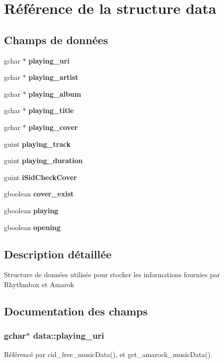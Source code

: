 \section{Référence de la structure data}
\label{structdata}
\subsection*{Champs de données}
\begin{CompactItemize}
\item 
gchar $\ast$ {\bf playing\_\-uri}
\item 
gchar $\ast$ {\bf playing\_\-artist}
\item 
gchar $\ast$ {\bf playing\_\-album}
\item 
gchar $\ast$ {\bf playing\_\-title}
\item 
gchar $\ast$ {\bf playing\_\-cover}
\item 
guint {\bf playing\_\-track}
\item 
guint {\bf playing\_\-duration}
\item 
guint {\bf iSidCheckCover}
\item 
gboolean {\bf cover\_\-exist}
\item 
gboolean {\bf playing}
\item 
gboolean {\bf opening}
\end{CompactItemize}


\subsection{Description détaillée}
Structure de données utilisée pour stocker les informations fournies par Rhythmbox et Amarok 

\subsection{Documentation des champs}
\subsubsection{\setlength{\rightskip}{0pt plus 5cm}gchar$\ast$ {\bf data::playing\_\-uri}}\label{structdata_488eb7ba0c08a38407c0e89110eea793}




Référencé par cid\_\-free\_\-musicData(), et get\_\-amarock\_\-musicData().
